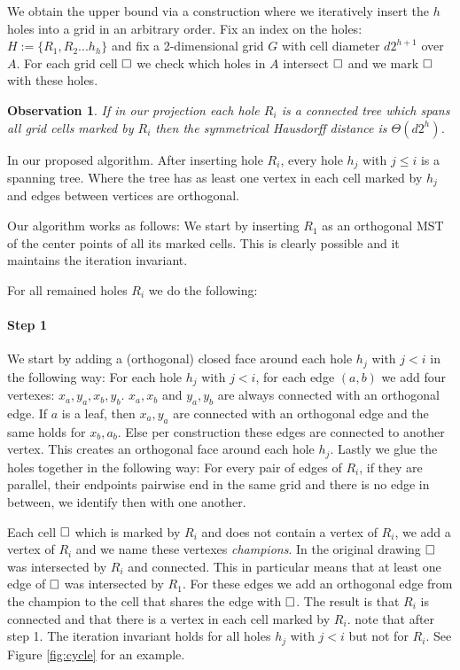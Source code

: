 \documentclass[a4paper,UKenglish,cleveref]{lipics-v2019}
\newtheorem{observation}{Observation}
\newcommand{\pix}{\square}
\begin{document}
We obtain the upper bound via a construction where we iteratively insert the $h$ holes into a grid in an arbitrary order.
Fix an index on the holes: $H := \{ R_1, R_2 ... h_h \}$ and fix a 2-dimensional grid $G$ with cell diameter $ d 2^{h+1}$ over $A$.
For each grid cell $\hfill\pix$ we check which holes in $A$ intersect $\hfill\pix$ and we mark $\hfill\pix$ with these holes.

\begin{observation}
If in our projection each hole $R_i$ is a connected tree which spans all grid cells marked by $R_i$ then the symmetrical Hausdorff distance is $\Theta(d2^h)$.
\end{observation}

\begin{definition}
In our proposed algorithm. After inserting hole $R_i$, every hole $h_j$ with $j \le i$ is a spanning tree. Where the tree has as least one vertex in each cell marked by $h_j$ and edges between vertices are orthogonal.
\end{definition}


Our algorithm works as follows: We start by inserting $R_1$ as an orthogonal MST of the center points of all its marked cells. This is clearly possible and it maintains the iteration invariant.



For all remained holes $R_i$ we do the following:

\paragraph*{Step 1}
We start by adding a (orthogonal) closed face around each hole $h_j$ with $j < i$ in the following way:
For each hole $h_j$ with $j < i$, for each edge $(a,b)$ we add four vertexes: $x_a, y_a, x_b, y_b$.  $x_a, x_b$ and $y_a,y_b$ are always connected with an orthogonal edge. If $a$ is a leaf, then $x_a,y_a$ are connected with an orthogonal edge and the same holds for $x_b,a_b$. Else per construction these edges are connected to another vertex. This creates an orthogonal face around each hole $h_j$.
Lastly we glue the holes together in the following way: For every pair of edges of $R_i$, if they are parallel, their endpoints pairwise end in the same grid and there is no edge in between, we identify then with one another.

Each cell $\hfill\pix$ which is marked by $R_i$ and does not contain a vertex of $R_i$, we add a vertex of $R_i$ and we name these vertexes \emph{champions}. In the original drawing $\hfill\pix$ was intersected by $R_i$ and connected. This in particular means that at least one edge of $\hfill\pix$ was intersected by $R_1$. For these edges we add an orthogonal edge from the champion to the cell that shares the edge with $\hfill\pix$. The result is that $R_i$ is connected and that there is a vertex in each cell marked by $R_i$.
note that after step 1. The iteration invariant holds for all holes $h_j$ with $j < i$ but not for $R_i$. See Figure \ref{fig:cycle} for an example.
\end{document}
